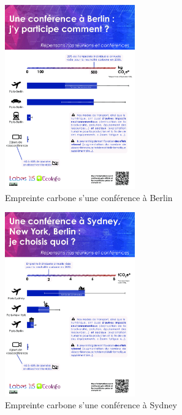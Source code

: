 \begin{figure}[ht]
    \centering
    \includegraphics[width=0.5\textwidth]{images/berlin_v7_fr.png}
    \caption{Empreinte carbone s'une conférence à Berlin}
    \label{fig:berlin}
\end{figure}

\begin{figure}[ht]
    \centering
    \includegraphics[width=0.5\textwidth]{images/sydney_v7_fr.png}
    \caption{Empreinte carbone s'une conférence à Sydney}
    \label{fig:sydney}
\end{figure}